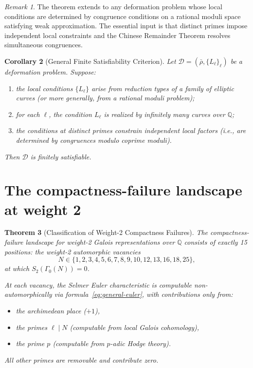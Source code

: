 \documentclass[12pt]{amsart}
\newtheorem{theorem}{Theorem}[section]
\newtheorem{corollary}[theorem]{Corollary}
\theoremstyle{definition}
\theoremstyle{remark}
\newtheorem{remark}[theorem]{Remark}
\newcommand{\rhobar}{\bar{\rho}}
\begin{document}
\begin{remark}
The theorem extends to any deformation problem whose local conditions are determined by congruence conditions on a rational moduli space satisfying weak approximation. The essential input is that distinct primes impose independent local constraints and the Chinese Remainder Theorem resolves simultaneous congruences.
\end{remark}

\begin{corollary}[General Finite Satisfiability Criterion]\label{cor:general-fsat}
Let $\mathcal{D} = (\rhobar, \{L_\ell\}_\ell)$ be a deformation problem. Suppose:
\begin{enumerate}[label=(\alph*)]
\item the local conditions $\{L_\ell\}$ arise from reduction types of a family of elliptic curves (or more generally, from a rational moduli problem);
\item for each $\ell$, the condition $L_\ell$ is realized by infinitely many curves over $\mathbb{Q}$;
\item the conditions at distinct primes constrain independent local factors (i.e., are determined by congruences modulo coprime moduli).
\end{enumerate}
Then $\mathcal{D}$ is finitely satisfiable.
\end{corollary}

\section{The compactness-failure landscape at weight 2}
\label{sec:landscape}

\begin{theorem}[Classification of Weight-2 Compactness Failures]\label{thm:landscape}
The compactness-failure landscape for weight-2 Galois representations over $\mathbb{Q}$ consists of exactly 15 positions: the weight-2 automorphic vacancies
$$N \in \{1, 2, 3, 4, 5, 6, 7, 8, 9, 10, 12, 13, 16, 18, 25\},$$
at which $S_2(\Gamma_0(N)) = 0$.

At each vacancy, the Selmer Euler characteristic is computable non-automorphically via formula~\eqref{eq:general-euler}, with contributions only from:
\begin{itemize}
\item the archimedean place ($+1$),
\item the primes $\ell \mid N$ (computable from local Galois cohomology),
\item the prime $p$ (computable from $p$-adic Hodge theory).
\end{itemize}
All other primes are removable and contribute zero.
\end{theorem}
\end{document}
